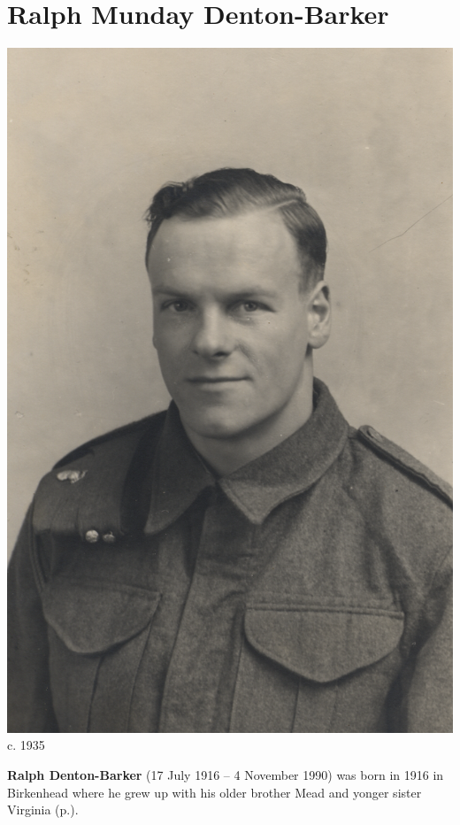 \section{Ralph Munday Denton-Barker}\label{Ralph_Munday_Denton-Barker}

\begin{center}
\includegraphics[width=0.8\linewidth]{photos/Ralph_Munday_Denton-Barker} \\
{\footnotesize c. 1935\cite{FlickrTeachers}}
\end{center}

\textbf{Ralph Denton-Barker} (17 July 1916 -- 4 November 1990) was born in 1916 in Birkenhead \cite{FreeBMD_RMDB_birth} where he grew up with his older brother Mead and yonger sister Virginia (p.\pageref{Virginia_Kathleen_Denton_Barker}).

